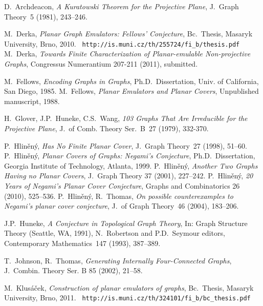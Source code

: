 \documentclass[envcountsect,envcountsame]{llncs}
\begin{document}
\begin{thebibliography}{99}


   D.~Archdeacon, {\em A Kuratowski Theorem for the Projective Plane\/},
   J.~Graph Theory~5 (1981), 243--246.


   M.~Derka, {\em Planar Graph Emulators: Fellows' Conjecture},
   Bc.~Thesis, Masaryk University, Brno, 2010.
	~\verb#http://is.muni.cz/th/255724/fi_b/thesis.pdf#
   M.~Derka, {\em Towards Finite Characterization of
	Planar-emulable Non-projective Graphs},
   Congressus Numerantium 207-211 (2011), submitted.

   M.~Fellows, {\em Encoding Graphs in Graphs},
   Ph.D.~Dissertation, Univ. of California, San Diego, 1985.
   M.~Fellows, {\em Planar Emulators and Planar Covers},
   Unpublished manuscript, 1988.

    H.~Glover, J.P.~Huneke, C.S.~Wang,
    {\em 103 Graphs That Are Irreducible for the Projective Plane},
    J.~of Comb. Theory Ser.~B~27 (1979), 332-370.

   P.~Hlin\v en\'y, {\em  Has No Finite Planar Cover},
   J.~Graph Theory~27 (1998), 51--60.
   P.~Hlin\v en\'y, {\em Planar Covers of Graphs: Negami's Conjecture},
   Ph.D.~Dissertation, Georgia Institute of Technology, Atlanta, 1999.
   P.~Hlin\v en\'y, {\em Another Two Graphs Having no Planar Covers},
   J.~Graph Theory 37 (2001), 227--242.
   P.~Hlin\v en\'y, {\em 20 Years of Negami's Planar Cover Conjecture},
   Graphs and Combinatorics 26 (2010), 525--536.
   P.~Hlin\v en\'y, R.~Thomas,
   {\em On possible counterexamples to Negami's planar cover conjecture},
    J.~of Graph Theory~46 (2004), 183--206.

    J.P.~Huneke, {\em A Conjecture in Topological Graph Theory\/},
    In: Graph Structure Theory (Seattle, WA, 1991),
    N.~Robertson and P.D.~Seymour editors, Contemporary Mathematics~147
    (1993), 387--389.

    T.~Johnson, R.~Thomas, {\em Generating Internally Four-Connected Graphs},
    J.~Combin. Theory Ser. B 85 (2002), 21--58.



   M.~Klus\'a\v cek, {\em Construction of planar emulators of graphs},
   Bc.~Thesis, Masaryk University, Brno, 2011.
	~\verb#http://is.muni.cz/th/324101/fi_b/bc_thesis.pdf#




\end{thebibliography}
\end{document}
